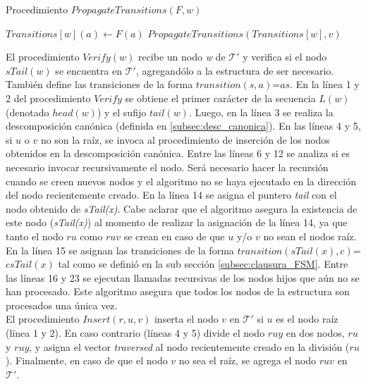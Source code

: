 \begin{algorithm}[h]
\small
\caption{Procedimiento $PropagateTransitions(F, w)$}
\label{Algorithm:PropagateTransitions}
\begin{algorithmic}[1]
		\State $Transitions[w](a) \gets F(a)$
	\EndIf
\EndFor
{} 
	\State $PropagateTransitions(Transitions[w], v)$
\EndFor
\Statex
\end{algorithmic}
  \vspace{-0.4cm}%
\end{algorithm} 
El procedimiento $Verify(w)$ recibe un nodo {\it w} de {\it $\mathcal{T}'$} y verifica si el nodo $sTail(w)$ se encuentra en {\it $\mathcal{T}'$}, agregandólo a la estructura de ser necesario. También define las transiciones de la forma $transition(s,a)$=$as$. En la línea 1 y 2 del procedimiento $Verify$ se obtiene el primer carácter de la secuencia $L(w)$ (denotado $head(w)$) y el sufijo $tail(w)$. Luego, en la línea 3 se realiza la descomposición canónica (definida en \ref{subsec:desc_canonica}). En las líneas 4 y 5, si $u$ o $v$ no son la raíz, se invoca al procedimiento de inserción de los nodos obtenidos en la descomposición canónica. Entre las líneas 6 y 12 se analiza si es necesario invocar recursivamente el nodo. Será necesario hacer la recursión cuando se creen nuevos nodos y el algoritmo no se haya ejecutado en la dirección del nodo recientemente creado. En la línea 14 se asigna el puntero \emph{tail} con el nodo obtenido de \emph{sTail(x)}. Cabe aclarar que el algoritmo asegura la existencia de este nodo (\emph{sTail(x)}) al momento de realizar la asignación de la línea 14, ya que tanto el nodo $ru$ como $ruv$ se crean en caso de que $u$ y/o $v$ no sean el nodos raíz.\\
En la línea 15 se asignan las transiciones de la forma $transition(sTail(x),c)$=$csTail(x)$ tal como se definió en la sub sección \ref{subsec:clausura_FSM}. Entre las líneas 16 y 23 se ejecutan llamadas recursivas de los nodos hijos que aún no se han procesado. Este algoritmo asegura que todos los nodos de la estructura son procesados una única vez.\\
El procedimiento $Insert(r, u, v)$ inserta el nodo $v$ en $\mathcal{T}'$ si $u$ es el nodo raíz (línea 1 y 2).
En caso contrario (líneas 4 y 5) divide el nodo $ruy$ en dos nodos, $ru$ y $ruy$, y asigna el vector \emph{traversed} al nodo recientemente creado en la división ($ru$). Finalmente, en caso de que el nodo $v$ no sea el raíz, se agrega el nodo $ruv$ en $\mathcal{T}'$.\\
